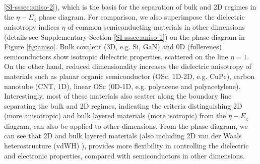 \documentclass[journal=ancac3,manuscript=article,email=true,hyperref=true,keywords=false]{achemso}
\begin{document}
\ref{SI-sssec:aniso-2}), which is the basis for the separation of bulk
and 2D regimes in the $\eta-E_{\mathrm{g}}$ phase diagram.  For
comparison, we also superimpose the dielectric anisotropy indices
$\eta$ of common semiconducting materials in other dimensions (details
see Supplementary Section \ref{SI-sssec:aniso-1}) on the phase diagram in Figure
\ref{fig:aniso}. Bulk covalent (3D, e.g. Si, GaN) and 0D (fullerenes)
semiconductors show isotropic dielectric properties, scattered on the
line $\eta=1$. On the other hand, reduced dimensionality increases the
dielectric anisotropy of materials such as planar organic
semiconductor (OSc, 1D-2D, e.g. CuPc), carbon nanotube (CNT, 1D),
linear OSc (0D-1D, e.g. polyacene and polyacetylene). Interestingly,
most of these materials also scatter along the boundary line
separating the bulk and 2D regimes, indicating the criteria
distinguishing 2D (more anisotropic) and bulk layered materials (more
isotropic) from the $\eta-E_{\mathrm{g}}$ diagram, can also be applied
to other dimensions. From the phase diagram, we can see that 2D and
bulk layered materials (also including 2D van der Waals
heterostructure (vdWH) \cite{Novoselov_2016}), provides more
flexibility in controlling the dielectric and electronic properties,
compared with semiconductors in other dimensions.  
\end{document}
